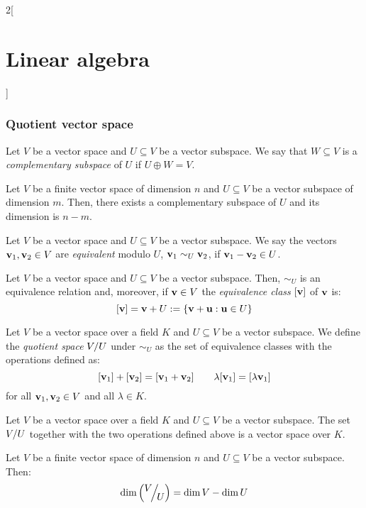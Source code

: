 \documentclass[../../../main_math.tex]{subfiles}
\begin{document}
\begin{multicols}{2}[\section{Linear algebra}]
  \subsubsection{Quotient vector space}
  \begin{definition}
    Let $V$ be a vector space and $U\subseteq V$ be a vector subspace. We say that $W\subseteq V$ is a \emph{complementary subspace} of $U$ if $U\oplus W=V$.
  \end{definition}
  \begin{definition}
    Let $V$ be a finite vector space of dimension $n$ and $U\subseteq V$ be a vector subspace of dimension $m$. Then, there exists a complementary subspace of $U$ and its dimension is $n-m$.
  \end{definition}
  \begin{definition}
    Let $V$ be a vector space and $U\subseteq V$ be a vector subspace. We say the vectors $\boldsymbol{\mathrm{v}}_1,\boldsymbol{\mathrm{v}}_2\in V$ are \emph{equivalent} modulo $U$, $\boldsymbol{\mathrm{v}}_1\sim_U\boldsymbol{\mathrm{v}}_2$, if $\boldsymbol{\mathrm{v}}_1-\boldsymbol{\mathrm{v}}_2\in U$.
  \end{definition}
  \begin{lemma}
    Let $V$ be a vector space and $U\subseteq V$ be a vector subspace. Then, $\sim_U$ is an equivalence relation and, moreover, if $\boldsymbol{\mathrm{v}}\in V$ the \emph{equivalence class} $[\boldsymbol{\mathrm{v}}]$ of $\boldsymbol{\mathrm{v}}$ is: $$[\boldsymbol{\mathrm{v}}]=\boldsymbol{\mathrm{v}}+U:=\{\boldsymbol{\mathrm{v}}+\boldsymbol{\mathrm{u}}:\boldsymbol{\mathrm{u}}\in U\}$$
  \end{lemma}
  \begin{definition}
    Let $V$ be a vector space over a field $K$ and $U\subseteq V$ be a vector subspace. We define the \emph{quotient space} $\quot{V}{U}$ under $\sim_U$ as the set of equivalence classes with the operations defined as:
    $$[\boldsymbol{\mathrm{v}}_1]+[\boldsymbol{\mathrm{v}}_2]=[\boldsymbol{\mathrm{v}}_1+\boldsymbol{\mathrm{v}}_2]\qquad \lambda[\boldsymbol{\mathrm{v}}_1]=[\lambda\boldsymbol{\mathrm{v}}_1]$$
    for all $\boldsymbol{\mathrm{v}}_1,\boldsymbol{\mathrm{v}}_2\in V$ and all $\lambda\in K$.
  \end{definition}
  \begin{proposition}
    Let $V$ be a vector space over a field $K$ and $U\subseteq V$ be a vector subspace. The set $\quot{V}{U}$ together with the two operations defined above is a vector space over $K$.
  \end{proposition}
  \begin{proposition}
    Let $V$ be a finite vector space of dimension $n$ and $U\subseteq V$ be a vector subspace. Then: $$\dim\left(\quot{V}{U}\right)=\dim V-\dim U$$
  \end{proposition}

\end{multicols}
\end{document}
